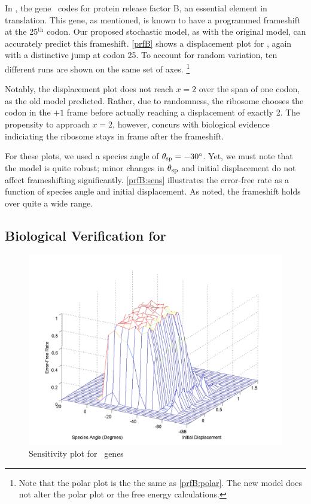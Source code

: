 \documentclass[12pt, draft]{article}
\numberwithin{equation}{section}
\begin{document}
In \ecoli, the gene \prfB\ codes for protein release factor B, an
essential element in translation.  This gene, as mentioned, is known
to have a programmed frameshift at the 25$^{\textrm{th}}$ codon.  Our
proposed stochastic model, as with the original model, can accurately
predict this frameshift.  \autoref{prfB} shows a displacement plot for
\prfB, again with a distinctive jump at codon 25.  To account for
random variation, ten different runs are shown on the same set of
axes.
\footnote{Note that the polar plot is the the same as \autoref{prfB:polar}. 
The new model does not alter the polar plot or the free energy calculations.}

Notably, the displacement plot does not reach $x=2$ over the span of one codon, as the old model predicted.
Rather, due to randomness, the ribosome chooses the codon in the $+1$ frame before actually reaching a displacement of exactly 2.
The propensity to approach $x=2$, however, concurs with biological
evidence indiciating the ribosome stays in frame after the frameshift.

For these plots, we used a species angle of $\theta_{\rm{sp}} =-30^\circ$.
Yet, we must note that the model is quite robust; minor changes
in $\theta_{\rm{sp}}$ and initial displacement do not affect frameshifting significantly.
\autoref{prfB:sens} illustrates the error-free rate as
a function of species angle and initial displacement. As noted,
the frameshift holds over quite a wide range.

\subsection{Biological Verification for \prfB}
\begin{figure}
  \centering
  \caption{Sensitivity plot for \ecoli\ genes}
  \label{prfB:sens}
  \includegraphics[scale=0.4]{prfB/sensitivity}
\end{figure}
\end{document}
